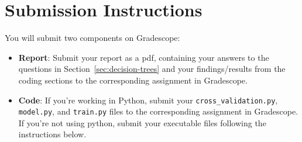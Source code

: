 \section{Submission Instructions}

You will submit two components on Gradescope:

\begin{itemize}
    \item \textbf{Report}: Submit your report as a pdf, containing your answers to the questions in 
    Section~\ref{sec:decision-trees} and your findings/results from the coding sections to the 
    corresponding assignment in Gradescope.
    \item \textbf{Code}: If you're working in Python, submit your \texttt{cross\_validation.py}, 
    \texttt{model.py}, and \texttt{train.py} files to the corresponding assignment in Gradescope.
    If you're not using python, submit your executable files following the instructions 
    below.
\end{itemize}


